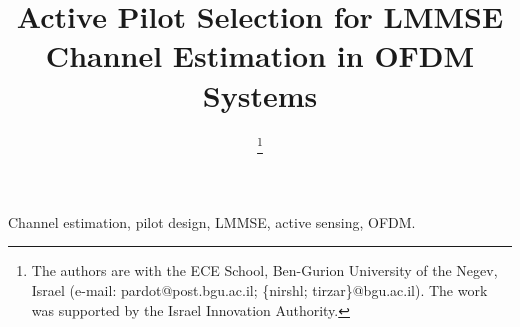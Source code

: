 \documentclass[conference]{IEEEtran}
\begin{document}
\title{Active Pilot Selection for LMMSE Channel Estimation in OFDM Systems}

\author{
\thanks{The authors are with the ECE School, Ben-Gurion University of the Negev, Israel (e-mail: pardot@post.bgu.ac.il; \{nirshl; tirzar\}@bgu.ac.il). The work was supported by the Israel Innovation Authority.}
}
\maketitle

\begin{abstract}

\end{abstract}

\begin{IEEEkeywords}
Channel estimation, pilot design, LMMSE, active sensing, OFDM.
\end{IEEEkeywords}









\end{document}
